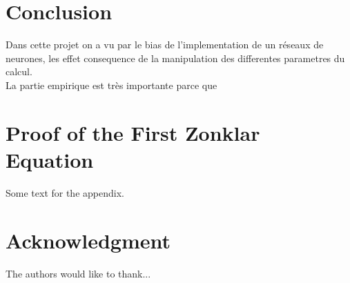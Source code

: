 \documentclass[journal]{IEEEtran}
\begin{document}
\section{Conclusion}

Dans cette projet on a vu par le bias de l'implementation de un réseaux de neurones, les 
effet consequence de la manipulation des differentes parametres du calcul.\\
La partie empirique est très importante parce que 


%
%

%


\appendices
\section{Proof of the First Zonklar Equation}
Some text for the appendix.

\section*{Acknowledgment}


The authors would like to thank...
\end{document}
